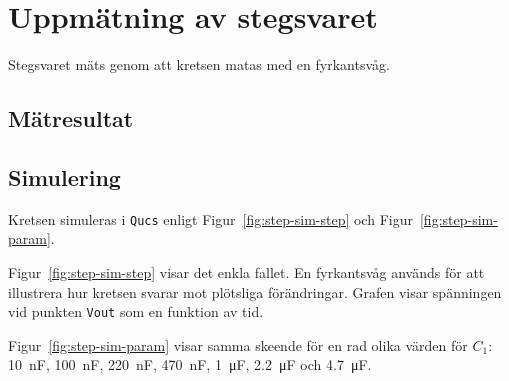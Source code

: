 %
%

\section{Uppmätning av stegsvaret}\label{step}
Stegsvaret mäts genom att kretsen matas med en fyrkantsvåg.

\subsection{Mätresultat}\label{}


\subsection{Simulering}\label{}
Kretsen simuleras i \texttt{Qucs} enligt Figur~\ref{fig:step-sim-step} och
Figur~\ref{fig:step-sim-param}.

Figur~\ref{fig:step-sim-step} visar det enkla fallet. En fyrkantsvåg används
för att illustrera hur kretsen svarar mot plötsliga förändringar. Grafen visar
spänningen vid punkten \texttt{Vout} som en funktion av tid.

Figur~\ref{fig:step-sim-param} visar samma skeende för en rad olika värden för
$C_1$: \SI{10}{\nano\farad}, \SI{100}{\nano\farad}, \SI{220}{\nano\farad}, 
\SI{470}{\nano\farad}, \SI{1}{\micro\farad}, \SI{2.2}{\micro\farad} och \SI{4.7}{\micro\farad}.


